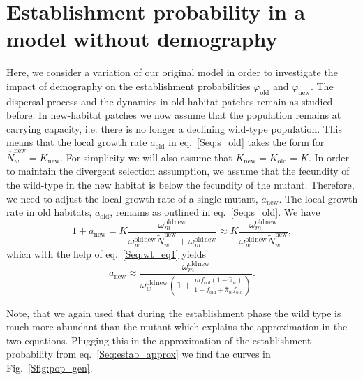 \documentclass[a4paper,11pt]{scrartcl}
\newcommand{\chg}[1]{\textcolor{change}{#1}}
\begin{document}
\newpage
\section{Establishment probability in a model without demography}
Here, we consider a variation of our original model in order to investigate the impact of demography on the establishment probabilities $\varphi_{\text{old}}$ and $\varphi_{\text{new}}$. The dispersal process and the dynamics in old-habitat patches remain as studied before. In new-habitat patches we now assume that the population remains at carrying capacity, i.e. there is no longer a declining wild-type population. This means that the local growth rate $a_{\text{old}}$ in eq.~\eqref{Seq:s_old} takes the form for $\widehat{N}_w^{\text{new}}=K_{\text{new}}$. For simplicity we will also assume that $K_{\text{new}}=K_{\text{old}}=K$. In order to maintain the divergent selection assumption, we assume that the fecundity of the wild-type in the new habitat is below the fecundity of the mutant. %
Therefore, we need to adjust the local growth rate of a single mutant, $a_{\text{new}}$. The local growth rate in old habitats, $a_{\text{old}}$, remains as outlined in eq.~\eqref{Seq:s_old}. We have
\begin{equation}
    1+a_{\text{new}} = K \frac{\omega^\text{old}_m^{\text{new}}}{\omega^\text{old}_w^{\text{new}} \widetilde{N}_w^{\text{new}}+ \omega^\text{old}_m^{\text{new}}}\approx K \frac{\omega^\text{old}_m^{\text{new}}}{\omega^\text{old}_w^{\text{new}} \widetilde{N}_w^{\text{new}}},
\end{equation}
which with the help of eq.~\eqref{Seq:wt_eq1} yields
\begin{equation}
    a_{\text{new}} \approx \frac{\omega^\text{old}_m^{\text{new}}}{\omega^\text{old}_w^{\text{new}}\left(1+\frac{m f_{\text{old}} (1-\widehat{\pi}_w)}{1-f_{\text{old}}+\widehat{\pi}_w f_{\text{old}}}\right)}.
\end{equation}

\chg{Note, that we again used that during the establishment phase the wild type is much more abundant than the mutant which explains the approximation in the two equations.}
Plugging this in the approximation of the establishment probability from eq.~\eqref{Seq:estab_approx} we find the curves in Fig.~\ref{Sfig:pop_gen}.
\end{document}

